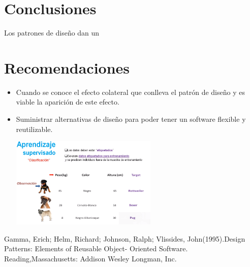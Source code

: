 \documentclass[twoside,twocolumn]{article}
\begin{document}


\section{Conclusiones}

Los patrones de diseño dan un


\section{Recomendaciones}


\begin{itemize}
\item Cuando se conoce el efecto colateral que conlleva el patrón de diseño y es viable la aparición de este efecto.
\item Suministrar alternativas de diseño para poder tener un software flexible y reutilizable.


\includegraphics[width=7cm]{Imagenes/imagen1}

\end{itemize}




\begin{thebibliography}{99} 

\bibitem[1]{}
\newblock Gamma, Erich; Helm, Richard; Johnson, Ralph; Vlissides, John(1995).Design Patterns: Elements of Reusable Object- Oriented Software. Reading,Massachusetts: Addison Wesley Longman, Inc.



\end{thebibliography}


\end{document}
